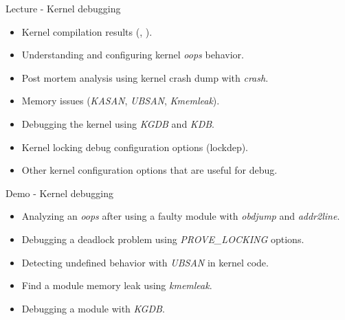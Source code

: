 \documentclass[a4paper,12pt,obeyspaces,spaces,hyphens]{article}
\begin{document}
\feagendatwocolumn
{Lecture - Kernel debugging}
{
  \begin{itemize}
  \item Kernel compilation results (, ).
  \item Understanding and configuring kernel {\em oops} behavior.
  \item Post mortem analysis using kernel crash dump with {\em crash}.
  \item Memory issues ({\em KASAN}, {\em UBSAN}, {\em Kmemleak}).
  \item Debugging the kernel using {\em KGDB} and {\em KDB}.
  \item Kernel locking debug configuration options (lockdep).
  \item Other kernel configuration options that are useful for debug.
  \end{itemize}
}
{Demo - Kernel debugging}
{
  \begin{itemize}
  \item Analyzing an {\em oops} after using a faulty module with
    {\em obdjump} and {\em addr2line}.
  \item Debugging a deadlock problem using {\em PROVE\_LOCKING} options.
  \item Detecting undefined behavior with {\em UBSAN} in kernel code.
  \item Find a module memory leak using {\em kmemleak}.
  \item Debugging a module with {\em KGDB}.
  \end{itemize}
}
\end{document}
